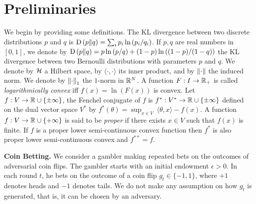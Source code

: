 \section{Preliminaries}
\label{section:preliminaries}

We begin by providing some definitions.  The \ac{KL} divergence between two
discrete distributions $p$ and $q$ is $\operatorname{D}\left({p}\middle\|{q}\right) = \sum_{i} p_i \ln\left(
p_i/q_i \right)$. If $p,q$ are real numbers in $[0,1]$, we denote by $\operatorname{D}\left({p}\middle\|{q}\right) =
p \ln \left(p/q \right) + (1-p) \ln \left((1-p)/(1-q) \right)$ the \ac{KL}
divergence between two Bernoulli distributions with parameters $p$ and $q$.  We
denote by $\mathcal{H}$ a Hilbert space, by $\langle \cdot, \cdot\rangle$ its inner
product, and by $\left\|{\cdot}\right\|$ the induced norm.  We denote by $\left\|{\cdot}\right\|_1$
the $1$-norm in $\mathbb{R}^N$.  A function $F:I \to \mathbb{R}_+$ is called
\emph{logarithmically convex} iff $f(x) = \ln(F(x))$ is convex.  Let $f:V \to \mathbb{R}
\cup \{\pm\infty\}$, the Fenchel conjugate of $f$ is $f^*:V^* \to \mathbb{R} \cup \{\pm
\infty\}$ defined on the dual vector space $V^*$ by $f^*(\theta) = \sup_{x \in
V} \ \langle \theta, x \rangle - f(x)$.  A function $f:V \to \mathbb{R} \cup
\{+\infty\}$ is said to be \emph{proper} if there exists $x \in V$ such that
$f(x)$ is finite.  If $f$ is a proper lower semi-continuous convex function then
$f^*$ is also proper lower semi-continuous convex and $f^{**}=f$.

\textbf{Coin Betting.} We consider a gambler making repeated bets on the
outcomes of adversarial coin flips. The gambler starts with an initial
endowment $\epsilon > 0$. In each round $t$, he bets on the outcome of a coin
flip $g_t \in \{-1,1\}$, where $+1$ denotes heads and $-1$ denotes tails.  We
do not make any assumption on how $g_t$ is generated, that is, it can be chosen
by an adversary.

